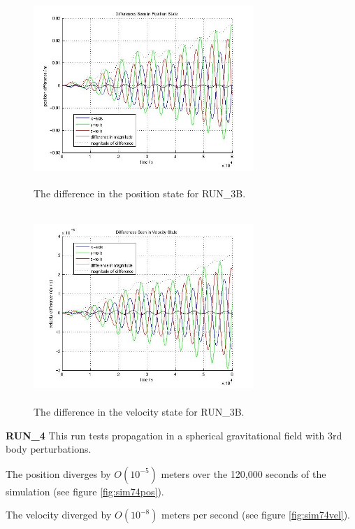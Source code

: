 \begin{description}
\begin{figure}[htp]
\begin{center}
\includegraphics[width=3.2736in,height=2.85in]{figures/run_3bhispdpos.jpg}
\caption{The difference in the position state for RUN\_3B.}
\label{fig:sim73bhispdpos}
\end{center}
\end{figure}

\begin{figure}[htp]
\begin{center}
\includegraphics[width=3.2736in,height=2.85in]{figures/run_3bhispdvel.jpg}
\caption{The difference in the velocity state for RUN\_3B.}
\label{fig:sim73bhispdvel}
\end{center}
\end{figure}

\clearpage
{\bf RUN\_4}
This run tests propagation in a spherical gravitational field with 3rd body 
perturbations.

The position diverges by $O(10^{-5})$ meters over the 120,000 seconds of the
simulation (see figure \ref{fig:sim74pos}).

The velocity diverged by $O(10^{-8})$ meters per second (see figure
\ref{fig:sim74vel}).


\end{description}
